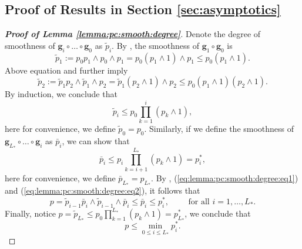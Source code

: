 \documentclass[11pt, preprint]{imsart}
\numberwithin{equation}{section}
\def \bfg{\mathbf{g}}
\theoremstyle{plain}
\theoremstyle{definition}
\begin{document}
\subsection{Proof of Results in Section \ref{sec:asymptotics}}\label{sec:proof:sec:4}
\begin{proof}[\textbf{Proof of Lemma \ref{lemma:pc:smooth:degree}}]
Denote the degree of smoothness of $\bfg_i\circ\ldots\circ\bfg_0$ as $\widetilde{p}_i$. By \cite{jlt09}, the smoothness of $\bfg_1\circ\bfg_0$ is 
\begin{equation*}
	\widetilde{p}_1:=p_0p_1\wedge p_0\wedge p_1=p_0(p_1\wedge 1)\wedge p_1\leq p_0(p_1\wedge 1).
\end{equation*}
Above equation and \cite{jlt09} further imply
\begin{equation*}
	\widetilde{p}_2:=\widetilde{p}_1p_2\wedge \widetilde{p}_1\wedge p_2=\widetilde{p}_1(p_2\wedge 1)\wedge p_2\leq p_0(p_1\wedge 1)(p_2\wedge 1).
\end{equation*}
By induction, we conclude that
\begin{equation}
	\widetilde{p}_i\leq p_0\prod_{k=1}^i(p_k\wedge 1),\label{eq:lemma:pc:smooth:degree:eq1}
\end{equation}
here for convenience, we define $\widetilde{p}_0=p_0$.
Similarly, if we define the smoothness of $\bfg_{L_*}\circ\ldots\circ\bfg_{i}$ as $\bar{p}_i$, we can show that
\begin{equation}
	\bar{p}_i\leq  p_{i}\prod_{k=i+1}^{L_*}(p_k\wedge 1)=p_{i}^*,\label{eq:lemma:pc:smooth:degree:eq2}
\end{equation} 
here for convenience, we define $\bar{p}_{L_*}=p_{L_*}$.
By \cite{jlt09}, (\ref{eq:lemma:pc:smooth:degree:eq1}) and (\ref{eq:lemma:pc:smooth:degree:eq2}), it follows that
\begin{equation*}
	p=\widetilde{p}_{i-1}\bar{p}_i\wedge \widetilde{p}_{i-1} \wedge \bar{p}_i\leq 	\bar{p}_i\leq p_{i}^*, \quad\quad\textrm{ for all } i=1,\ldots, L_*.
\end{equation*}
Finally, notice $p=\widetilde{p}_{L_*}\leq p_0\prod_{k=1}^{L_*}(p_k\wedge 1)=p_{L_*}^*$, we conclude that
\begin{equation*}
	p\leq \min_{0\leq i\leq L_*}p_i^*.
\end{equation*}
\end{proof}
\end{document}
